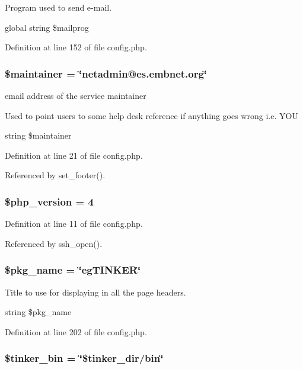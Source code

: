 Program used to send e-mail. 

global string \$mailprog 

Definition at line 152 of file config.php.
\subsubsection{\setlength{\rightskip}{0pt plus 5cm}\$maintainer = \char`\"{}netadmin@es.embnet.org\char`\"{}}\label{config_8php_a1}


email address of the service maintainer 

Used to point users to some help desk reference if anything goes wrong i.e. YOU

string \$maintainer 

Definition at line 21 of file config.php.

Referenced by set\_\-footer().
\subsubsection{\setlength{\rightskip}{0pt plus 5cm}\$php\_\-version = 4}\label{config_8php_a0}




Definition at line 11 of file config.php.

Referenced by ssh\_\-open().
\subsubsection{\setlength{\rightskip}{0pt plus 5cm}\$pkg\_\-name = \char`\"{}eg\-TINKER\char`\"{}}\label{config_8php_a20}


Title to use for displaying in all the page headers. 

string \$pkg\_\-name 

Definition at line 202 of file config.php.
\subsubsection{\setlength{\rightskip}{0pt plus 5cm}\$tinker\_\-bin = \char`\"{}\$tinker\_\-dir/bin\char`\"{}}\label{config_8php_a11}


